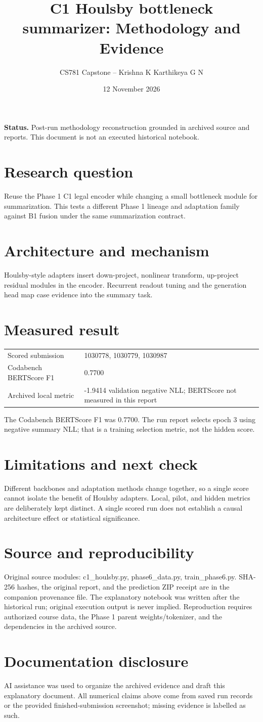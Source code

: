 \documentclass[11pt,a4paper]{article}
\title{C1 Houlsby bottleneck summarizer: Methodology and Evidence}
\author{CS781 Capstone -- Krishna K Karthikeya G N}
\date{12 November 2026}
\begin{document}
\maketitle
\noindent\textbf{Status.} Post-run methodology reconstruction grounded in archived source and reports. This document is not an executed historical notebook.\par
\section*{Research question}
Reuse the Phase 1 C1 legal encoder while changing a small bottleneck module for summarization. This tests a different Phase 1 lineage and adaptation family against B1 fusion under the same summarization contract.
\section*{Architecture and mechanism}
Houlsby-style adapters insert down-project, nonlinear transform, up-project residual modules in the encoder. Recurrent readout tuning and the generation head map case evidence into the summary task.
\section*{Measured result}
\begin{center}\begin{tabular}{ll}Scored submission & 1030778, 1030779, 1030987\\
Codabench BERTScore F1 & 0.7700\\
Archived local metric & -1.9414 validation negative NLL; BERTScore not measured in this report\end{tabular}\end{center}
The Codabench BERTScore F1 was 0.7700. The run report selects epoch 3 using negative summary NLL; that is a training selection metric, not the hidden score.
\section*{Limitations and next check}
Different backbones and adaptation methods change together, so a single score cannot isolate the benefit of Houlsby adapters. Local, pilot, and hidden metrics are deliberately kept distinct. A single scored run does not establish a causal architecture effect or statistical significance.
\section*{Source and reproducibility}
Original source modules: c1\_houlsby.py, phase6\_data.py, train\_phase6.py. SHA-256 hashes, the original report, and the prediction ZIP receipt are in the companion provenance file. The explanatory notebook was written after the historical run; original execution output is never implied. Reproduction requires authorized course data, the Phase 1 parent weights/tokenizer, and the dependencies in the archived source.
\section*{Documentation disclosure}
AI assistance was used to organize the archived evidence and draft this explanatory document. All numerical claims above come from saved run records or the provided finished-submission screenshot; missing evidence is labelled as such.
\end{document}

